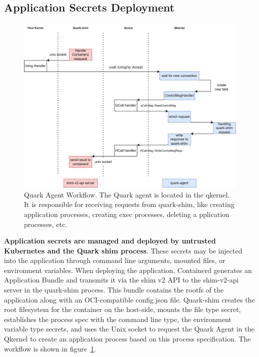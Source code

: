 \subsection{Application Secrets Deployment}
\begin{figure}[H]
    \centering
    \includegraphics[width=1\textwidth]{images/quark-agent-work-flow.png}
    \caption[Quark Agent Workflow]{Quark Agent Workflow. The Quark agent is located in the qkernel. It is responsible for receiving requests from quark-shim, like creating application processes, creating exec processes, deleting a
    pplication processes, etc.}
    \label{fig:quark_agent_work_flow}
\end{figure}


\textbf{Application secrets are managed and deployed by untrusted Kubernetes and the Quark shim process}. These secrets may be injected into the application through command line arguments, mounted files, or environment variables. When deploying 
the application, Containerd generates an Application Bundle and transmits it via the shim v2 API\cite*{shim_v2} to the shim-v2-api server in the quark-shim process. This bundle contains the rootfs of the application along with an OCI-compatible config.json file. Quark-shim 
creates the root filesystem for the container on the host-side, mounts the file type secret, establishes the process spec with the command line type, the environment variable type secrets, and uses the Unix socket to request the Quark 
Agent in the Qkernel to create an application process based on this process specification. The workflow is shown in figure~\ref{fig:quark_agent_work_flow}.


